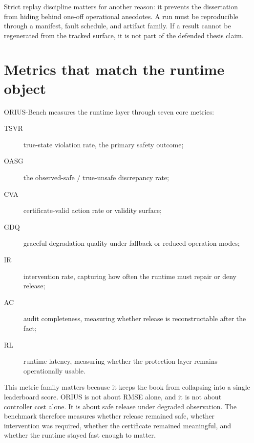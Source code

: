 Strict replay discipline matters for another reason: it prevents the dissertation from
hiding behind one-off operational anecdotes. A run must be reproducible through a manifest,
fault schedule, and artifact family. If a result cannot be regenerated from the tracked
surface, it is not part of the defended thesis claim.

\section{Metrics that match the runtime object}
ORIUS-Bench measures the runtime layer through seven core metrics:
\begin{description}
  \item[TSVR] true-state violation rate, the primary safety outcome;
  \item[OASG] the observed-safe / true-unsafe discrepancy rate;
  \item[CVA] certificate-valid action rate or validity surface;
  \item[GDQ] graceful degradation quality under fallback or reduced-operation modes;
  \item[IR] intervention rate, capturing how often the runtime must repair or deny release;
  \item[AC] audit completeness, measuring whether release is reconstructable after the fact;
  \item[RL] runtime latency, measuring whether the protection layer remains operationally
  usable.
\end{description}

This metric family matters because it keeps the book from collapsing into a single
leaderboard score. ORIUS is not about RMSE alone, and it is not about controller cost alone.
It is about safe release under degraded observation. The benchmark therefore measures
whether release remained safe, whether intervention was required, whether the certificate
remained meaningful, and whether the runtime stayed fast enough to matter.



